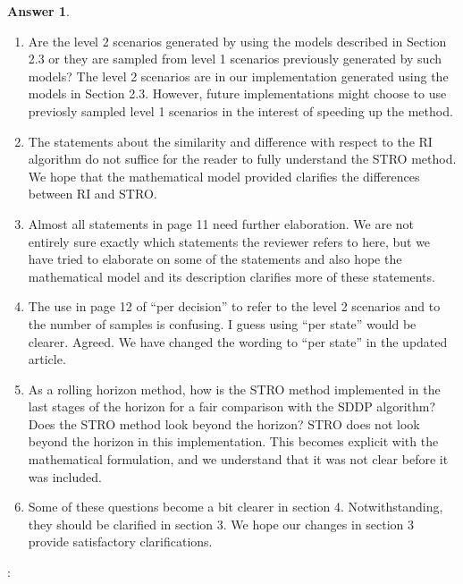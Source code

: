 \documentclass{article}
\theoremstyle{definition}
\newtheorem*{answer}{Answer}
\newcounter{commentCounter}
\newenvironment{comment}{ \vspace{.2cm} \raggedright \color{commentColor}{\bf Reviewer's Comment \arabic{commentCounter}}: }{\addtocounter{commentCounter}{1} \vspace{0.2cm} \color{black}}
\begin{document}
{{\begin{answer}
\begin{enumerate}
\item \textcolor{commentColor}{Are the level 2 scenarios generated by using the models described in Section 2.3 or they are sampled from level 1
scenarios previously generated by such models?} The level 2 scenarios are in our implementation generated using the models in Section 2.3. However, future implementations might choose to use previosly sampled level 1 scenarios in the interest of speeding up the method. 

\item \textcolor{commentColor}{The statements about the similarity and difference with respect to the RI algorithm do not suffice for the reader to fully understand the STRO method.} We hope that the mathematical model provided clarifies the differences between RI and STRO. 


\item \textcolor{commentColor}{Almost all statements in page 11 need further elaboration.} We are not entirely sure exactly which statements the reviewer refers to here, but we have tried to elaborate on some of the statements and also hope the mathematical model and its description clarifies more of these statements.  


\item \textcolor{commentColor}{The use in page 12 of ``per decision'' to refer to the level 2 scenarios and to the number of samples is confusing. I guess using ``per state'' would be clearer.} Agreed. We have changed the wording to ``per state'' in the updated article. 

\item \textcolor{commentColor}{As a rolling horizon method, how is the STRO method implemented in the last stages of the horizon for a fair comparison with the SDDP algorithm? Does the STRO method look beyond the horizon?} STRO does not look beyond the horizon in this implementation. This becomes explicit with the mathematical formulation, and we understand that it was not clear before it was included. 

\item \textcolor{commentColor}{Some of these questions become a bit clearer in section 4. Notwithstanding, they should be clarified in section 3.} We hope our changes in section 3 provide satisfactory clarifications. 

\end{enumerate}
\end{answer}


\begin{comment}


\end{comment}}}
\end{document}
